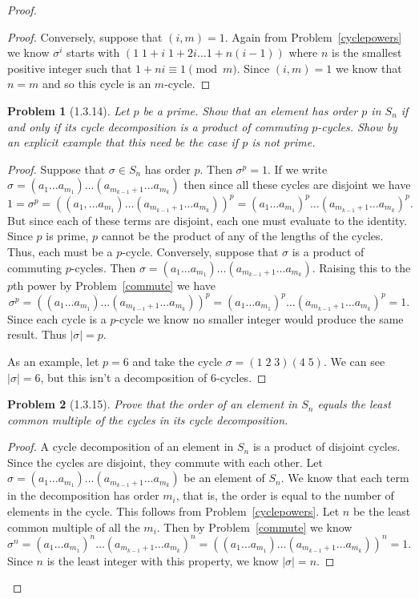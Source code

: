 \documentclass{article}
\newtheorem{problem}{Problem}
\begin{document}
\begin{proof}
\begin{proof}
Conversely, suppose that $(i,m) = 1$. Again from Problem~\ref{cyclepowers} we know $\sigma^i$ starts with $(1 \; 1 + i \; 1 + 2i \dots 1 + n(i-1))$ where $n$ is the smallest positive integer such that $1 + ni \equiv 1 \pmod{m}$. Since $(i,m) = 1$ we know that $n = m$ and so this cycle is an $m$-cycle.
\end{proof}

\begin{problem}[1.3.14]
Let $p$ be a prime. Show that an element has order $p$ in $S_n$ if and only if its cycle decomposition is a product of commuting $p$-cycles. Show by an explicit example that this need be the case if $p$ is not prime.
\end{problem}
\begin{proof}
Suppose that $\sigma \in S_n$ has order $p$. Then $\sigma^p = 1$. If we write $\sigma = (a_1 \dots a_{m_1})\dots(a_{m_{k-1}+1} \dots a_{m_k})$ then since all these cycles are disjoint we have
\[
1 = \sigma^p = ((a_1, \dots a_{m_1})\dots(a_{m_{k-1}+1} \dots a_{m_k}))^p = (a_1 \dots a_{m_1})^p\dots(a_{m_{k-1}+1} \dots a_{m_k})^p.
\]
But since each of these terms are disjoint, each one must evaluate to the identity. Since $p$ is prime, $p$ cannot be the product of any of the lengths of the cycles. Thus, each must be a $p$-cycle. Conversely, suppose that $\sigma$ is a product of commuting $p$-cycles. Then $\sigma = (a_1 \dots a_{m_1})\dots(a_{m_{k-1}+1} \dots a_{m_k})$. Raising this to the $p$th power by Problem~\ref{commute} we have
\[
\sigma^p = ((a_1 \dots a_{m_1})\dots(a_{m_{k-1}+1} \dots a_{m_k}))^p = (a_1 \dots a_{m_1})^p\dots(a_{m_{k-1}+1} \dots a_{m_k})^p = 1.
\]
Since each cycle is a $p$-cycle we know no smaller integer would produce the same result. Thus $|\sigma| = p$.

As an example, let $p = 6$ and take the cycle $\sigma = (1 \; 2 \; 3)(4 \; 5)$. We can see $|\sigma| = 6$, but this isn't a decomposition of $6$-cycles.
\end{proof}

\begin{problem}[1.3.15]
Prove that the order of an element in $S_n$ equals the least common multiple of the cycles in its cycle decomposition.
\end{problem}
\begin{proof}
A cycle decomposition of an element in $S_n$ is a product of disjoint cycles. Since the cycles are disjoint, they commute with each other. Let $\sigma = (a_1 \dots a_{m_1})\dots(a_{m_{k-1}+1} \dots a_{m_k})$ be an element of $S_n$. We know that each term in the decomposition has order $m_i$, that is, the order is equal to the number of elements in the cycle. This follows from Problem~\ref{cyclepowers}. Let $n$ be the least common multiple of all the $m_i$. Then by Problem~\ref{commute} we know
\[
\sigma^n = (a_1 \dots a_{m_1})^n\dots(a_{m_{k-1}+1} \dots a_{m_k})^n = ((a_1 \dots a_{m_1})\dots(a_{m_{k-1}+1} \dots a_{m_k}))^n = 1.
\]
Since $n$ is the least integer with this property, we know $|\sigma| = n$.
\end{proof}


\end{proof}
\end{document}
